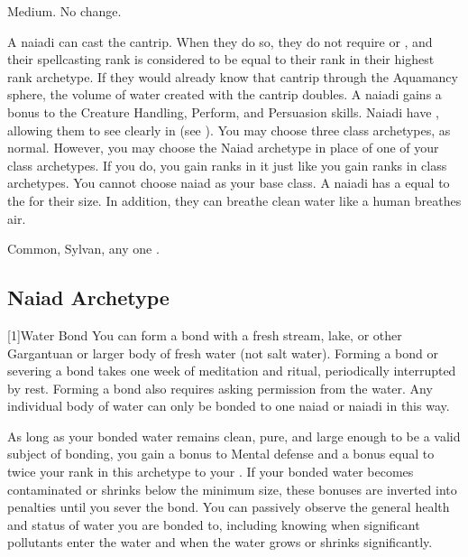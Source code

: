      Medium.
     No change.
    \begin{itemize}
         A naiadi can cast the  cantrip.
            When they do so, they do not require  or , and their spellcasting rank is considered to be equal to their rank in their highest rank archetype.
            If they would already know that cantrip through the Aquamancy sphere, the volume of water created with the cantrip doubles.
         A naiadi gains a  bonus to the Creature Handling, Perform, and Persuasion skills.
         Naiadi have , allowing them to see clearly in  (see ).
         You may choose three class archetypes, as normal.
            However, you may choose the Naiad archetype in place of one of your class archetypes.
            If you do, you gain ranks in it just like you gain ranks in class archetypes.
            You cannot choose naiad as your base class.
         A naiadi has a  equal to the  for their size.
            In addition, they can breathe clean water like a human breathes air.
    \end{itemize}
     Common, Sylvan, any one .

    \subsection{Naiad Archetype}

        [1]{Water Bond} You can form a bond with a fresh stream, lake, or other Gargantuan or larger body of fresh water (not salt water).
        Forming a bond or severing a bond takes one week of meditation and ritual, periodically interrupted by rest.
        Forming a bond also requires asking permission from the water.
        Any individual body of water can only be bonded to one naiad or naiadi in this way.

        As long as your bonded water remains clean, pure, and large enough to be a valid subject of bonding, you gain a  bonus to Mental defense and a bonus equal to twice your rank in this archetype to your .
        If your bonded water becomes contaminated or shrinks below the minimum size, these bonuses are inverted into penalties until you sever the bond.
        You can passively observe the general health and status of water you are bonded to, including knowing when significant pollutants enter the water and when the water grows or shrinks significantly.

